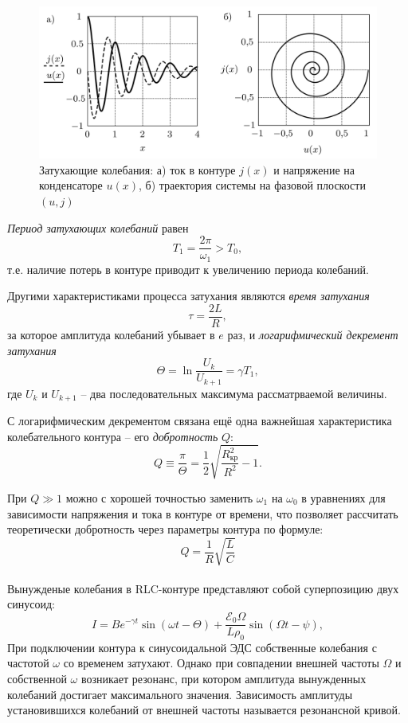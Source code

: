 \documentclass[a4paper,12pt]{article}
\begin{document}
\begin{figure}[h]
	\centering
	\includegraphics[scale=0.24]{th}
	\caption{Затухающие колебания: а) ток в контуре $j(x)$ и напряжение на конденсаторе $u(x)$, б) траектория системы на фазовой плоскости $(u,j)$} \label{th}
\end{figure}

\textit{Период затухающих колебаний} равен\[T_1=\frac{2\pi}{\omega_1} > T_0,\]т.е. наличие потерь в контуре приводит к увеличению периода колебаний.

Другими характеристиками процесса затухания являются \textit{время затухания}\[\tau=\frac{2L}{R},\] за которое амплитуда колебаний убывает в $e$ раз, и \textit{логарифмический декремент затухания}\[\Theta=\ln{\frac{U_k}{U_{k+1}}}=\gamma T_1,\]где $U_k$ и $U_{k+1}$ -- два последовательных максимума рассматрваемой величины.

С логарифмическим декрементом связана ещё одна важнейшая характеристика колебательного контура -- его \textit{добротность} $Q$:\[Q\equiv\frac{\pi}{\Theta}=\frac{1}{2}\sqrt{\frac{R_{\text{кр}}^2}{R^2}-1}.\]

При $Q\gg1$ можно с хорошей точностью заменить $\omega_1$ на $\omega_0$ в уравнениях для зависимости напряжения и тока в контуре от времени, что позволяет рассчитать теоретически добротность через параметры контура по формуле:
\begin{equation}\label{teor}
	Q = \frac{1}{R } \sqrt{\frac{L}{C}}
\end{equation}
\\
$$                                                             
$$
Вынужденые колебания в RLC-контуре представляют собой суперпозицию двух синусоид:
\begin{equation}
	I= B e^{-\gamma t} \sin (\omega t - \Theta)+ \frac{\mathcal{E}_0 \Omega}{L \rho_0} \sin (\Omega t - \psi),
	\label{law}
\end{equation}
При подключении контура к синусоидальной ЭДС собственные колебания с частотой $\omega$ со временем затухают. Однако при совпадении внешней частоты $ \Omega $ и собственной $ \omega $ возникает резонанс, при котором амплитуда вынужденных колебаний достигает максимального значения. Зависимость амплитуды установившихся колебаний от внешней частоты называется резонансной кривой.
\end{document}
